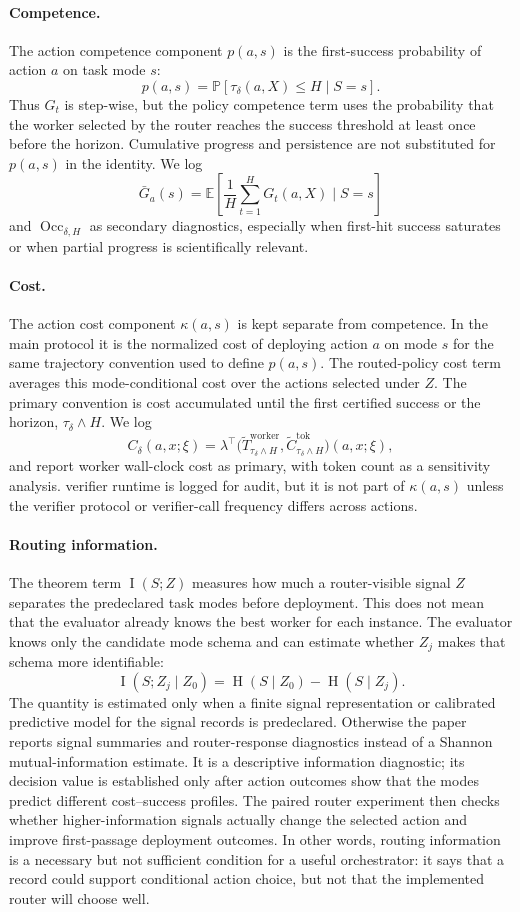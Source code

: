 \documentclass{article}
\DeclareMathOperator{\MI}{I}
\DeclareMathOperator{\Hent}{H}
\DeclareMathOperator{\Occ}{Occ}
\newcommand{\E}{\mathbb{E}}
\newcommand{\Prb}{\mathbb{P}}
\begin{document}
\paragraph{Competence.}
The action competence component $p(a,s)$ is the first-success probability of action $a$ on task mode $s$:
\[
p(a,s)=\Prb[\tau_\delta(a,X)\le H\mid S=s].
\]
Thus $G_t$ is step-wise, but the policy competence term uses the probability that the worker selected by the router reaches the success threshold at least once before the horizon.
Cumulative progress and persistence are not substituted for $p(a,s)$ in the identity.
We log
\[
\bar G_a(s)=\E\!\left[\frac{1}{H}\sum_{t=1}^H G_t(a,X)\mid S=s\right]
\]
and $\Occ_{\delta,H}$ as secondary diagnostics, especially when first-hit success saturates or when partial progress is scientifically relevant.

\paragraph{Cost.}
The action cost component $\kappa(a,s)$ is kept separate from competence.
In the main protocol it is the normalized cost of deploying action $a$ on mode $s$ for the same trajectory convention used to define $p(a,s)$.
The routed-policy cost term averages this mode-conditional cost over the actions selected under $Z$.
The primary convention is cost accumulated until the first certified success or the horizon, $\tau_\delta\wedge H$.
We log
\[
C_\delta(a,x;\xi)
=
\lambda^\top
\bigl(
\widetilde T^{\mathrm{worker}}_{\tau_\delta\wedge H},
\widetilde C^{\mathrm{tok}}_{\tau_\delta\wedge H}
\bigr)(a,x;\xi),
\]
and report worker wall-clock cost as primary, with token count as a sensitivity analysis.
verifier runtime is logged for audit, but it is not part of $\kappa(a,s)$ unless the verifier protocol or verifier-call frequency differs across actions.

\paragraph{Routing information.}
The theorem term $\MI(S;Z)$ measures how much a router-visible signal $Z$ separates the predeclared task modes before deployment.
This does not mean that the evaluator already knows the best worker for each instance.
The evaluator knows only the candidate mode schema and can estimate whether $Z_j$ makes that schema more identifiable:
\[
\MI(S;Z_j\mid Z_0)=\Hent(S\mid Z_0)-\Hent(S\mid Z_j).
\]
The quantity is estimated only when a finite signal representation or calibrated predictive model for the signal records is predeclared.
Otherwise the paper reports signal summaries and router-response diagnostics instead of a Shannon mutual-information estimate.
It is a descriptive information diagnostic; its decision value is established only after action outcomes show that the modes predict different cost--success profiles.
The paired router experiment then checks whether higher-information signals actually change the selected action and improve first-passage deployment outcomes.
In other words, routing information is a necessary but not sufficient condition for a useful orchestrator: it says that a record could support conditional action choice, but not that the implemented router will choose well.
\end{document}
